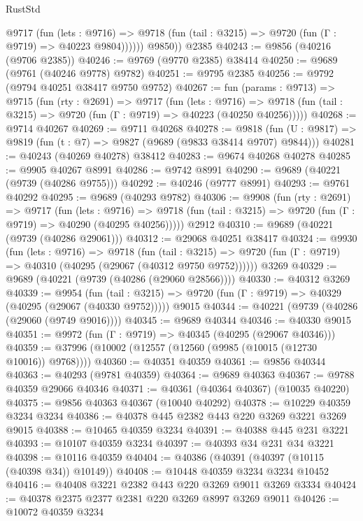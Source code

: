 \begin{lexlean}{RustStd}
\begin{coremodule}
            @9717
              (fun (lets : @9716) =>
              @9718 (fun (tail : @3215) => @9720 (fun (Γ : @9719) => @40223 @9804))))))
        @9850))
    @2385
@40243 := @9856 (@40216 (@9706 @2385))
@40246 := @9769 (@9770 @2385) @38414
@40250 := @9689 (@9761 (@40246 @9778) @9782)
@40251 := @9795 @2385
@40256 := @9792 (@9794 @40251 @38417 @9750 @9752)
@40267 := fun (params : @9713) =>
  @9715
    (fun (rty : @2691) =>
    @9717
      (fun (lets : @9716) =>
      @9718 (fun (tail : @3215) => @9720 (fun (Γ : @9719) => @40223 (@40250 @40256)))))
@40268 := @9714 @40267
@40269 := @9711 @40268
@40278 := @9818
    (fun (U : @9817) => @9819 (fun (t : @7) => @9827 (@9689 (@9833 @38414 @9707) @9844)))
@40281 := @40243 (@40269 @40278) @38412
@40283 := @9674 @40268 @40278
@40285 := @9905 @40267 @8991
@40286 := @9742 @8991
@40290 := @9689 (@40221 (@9739 (@40286 @9755)))
@40292 := @40246 (@9777 @8991)
@40293 := @9761 @40292
@40295 := @9689 (@40293 @9782)
@40306 := @9908
    (fun (rty : @2691) =>
    @9717
      (fun (lets : @9716) =>
      @9718 (fun (tail : @3215) => @9720 (fun (Γ : @9719) => @40290 (@40295 @40256)))))
    @2912
@40310 := @9689 (@40221 (@9739 (@40286 @29061)))
@40312 := @29068 @40251 @38417
@40324 := @9930
    (fun (lets : @9716) =>
    @9718
      (fun (tail : @3215) =>
      @9720 (fun (Γ : @9719) => @40310 (@40295 (@29067 (@40312 @9750 @9752))))))
    @3269
@40329 := @9689 (@40221 (@9739 (@40286 (@29060 @28566))))
@40330 := @40312 @3269
@40339 := @9954
    (fun (tail : @3215) => @9720 (fun (Γ : @9719) => @40329 (@40295 (@29067 (@40330 @9752)))))
    @9015
@40344 := @40221 (@9739 (@40286 (@29060 (@9749 @9016))))
@40345 := @9689 @40344
@40346 := @40330 @9015
@40351 := @9972 (fun (Γ : @9719) => @40345 (@40295 (@29067 @40346)))
@40359 := @37996 (@10002 (@12557 (@12560 (@9985 (@10015 (@12730 @10016)) @9768))))
@40360 := @40351 @40359
@40361 := @9856 @40344
@40363 := @40293 (@9781 @40359)
@40364 := @9689 @40363
@40367 := @9788 @40359 @29066 @40346
@40371 := @40361 (@40364 @40367) (@10035 @40220)
@40375 := @9856 @40363 @40367 (@10040 @40292)
@40378 := @10229 @40359 @3234 @3234
@40386 := @40378 @445 @2382 @443 @220 @3269 @3221 @3269 @9015
@40388 := @10465 @40359 @3234
@40391 := @40388 @445 @231 @3221
@40393 := @10107 @40359 @3234
@40397 := @40393 @34 @231 @34 @3221
@40398 := @10116 @40359
@40404 := @40386 (@40391 (@40397 (@10115 (@40398 @34)) @10149))
@40408 := @10448 @40359 @3234 @3234 @10452
@40416 := @40408 @3221 @2382 @443 @220 @3269 @9011 @3269 @3334
@40424 := @40378 @2375 @2377 @2381 @220 @3269 @8997 @3269 @9011
@40426 := @10072 @40359 @3234

\end{coremodule}
\end{lexlean}
